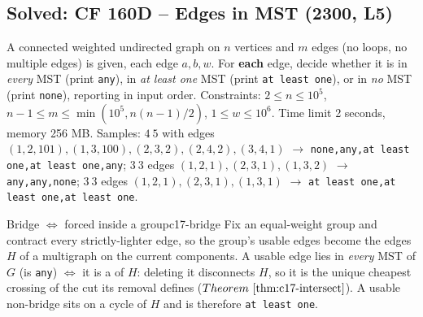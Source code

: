 \subsection{Solved: CF 160D -- Edges in MST (2300, L5)}


\begin{problemstatement}
A connected weighted undirected graph on \(n\) vertices and \(m\) edges (no loops,
no multiple edges) is given, each edge \(a,b,w\).  For \textbf{each} edge, decide
whether it is in \emph{every} MST (print \texttt{any}), in \emph{at least one} MST
(print \texttt{at least one}), or in \emph{no} MST (print \texttt{none}), reporting
in input order.  Constraints: \(2\le n\le 10^5\), \(n-1\le m\le\min(10^5,
n(n-1)/2)\), \(1\le w\le 10^6\).  Time limit 2 seconds, memory 256 MB.  Samples:
\(4\ 5\) with edges \((1,2,101),(1,3,100),(2,3,2),(2,4,2),(3,4,1)\) \(\to\)
\texttt{none,any,at least one,at least one,any}; \(3\ 3\) edges
\((1,2,1),(2,3,1),(1,3,2)\) \(\to\) \texttt{any,any,none}; \(3\ 3\) edges
\((1,2,1),(2,3,1),(1,3,1)\) \(\to\) \texttt{at least one,at least one,at least one}.
\end{problemstatement}

\begin{lemma}{Bridge \(\iff\) forced inside a group}{c17-bridge}
Fix an equal-weight group and contract every strictly-lighter edge, so the group's
usable edges become the edges \(H\) of a multigraph on the current components.  A
usable edge lies in \emph{every} MST of \(G\) (is \texttt{any}) \(\iff\) it is a
 of \(H\): deleting it disconnects \(H\), so it is the unique cheapest
crossing of the cut its removal defines (\(\thmref{c17-intersect}\)).  A usable
non-bridge sits on a cycle of \(H\) and is therefore \texttt{at least one}.
\end{lemma}

